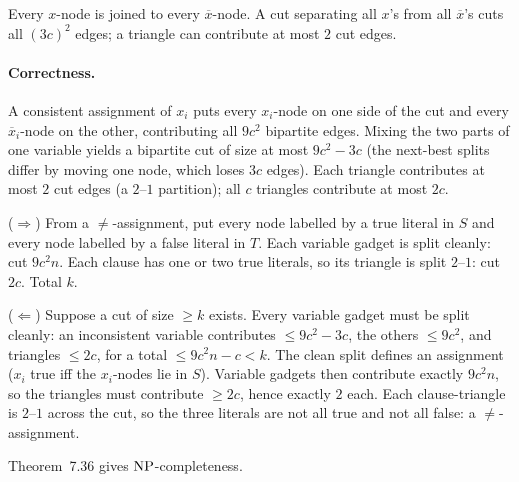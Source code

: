 \begin{soln}
\begin{center}
{\footnotesize Every $x$-node is joined to every $\overline{x}$-node. A cut separating all $x$'s from all $\overline{x}$'s cuts all $(3c)^2$ edges; a triangle can contribute at most $2$ cut edges.}
\end{center}

\paragraph{Correctness.}
A consistent assignment of $x_i$ puts every $x_i$-node on one side of the cut and every $\overline{x}_i$-node on the other, contributing all $9c^2$ bipartite edges. Mixing the two parts of one variable yields a bipartite cut of size at most $9c^2-3c$ (the next-best splits differ by moving one node, which loses $3c$ edges). Each triangle contributes at most $2$ cut edges (a $2$--$1$ partition); all $c$ triangles contribute at most $2c$.

($\Rightarrow$) From a $\neq$-assignment, put every node labelled by a true literal in $S$ and every node labelled by a false literal in $T$. Each variable gadget is split cleanly: cut $9c^2 n$. Each clause has one or two true literals, so its triangle is split $2$--$1$: cut $2c$. Total $k$.

($\Leftarrow$) Suppose a cut of size $\ge k$ exists. Every variable gadget must be split cleanly: an inconsistent variable contributes $\le 9c^2-3c$, the others $\le 9c^2$, and triangles $\le 2c$, for a total $\le 9c^2 n-c<k$. The clean split defines an assignment ($x_i$ true iff the $x_i$-nodes lie in $S$). Variable gadgets then contribute exactly $9c^2 n$, so the triangles must contribute $\ge 2c$, hence exactly $2$ each. Each clause-triangle is $2$--$1$ across the cut, so the three literals are not all true and not all false: a $\neq$-assignment.

Theorem~7.36 gives $\mathrm{NP}$-completeness.
\end{soln}

